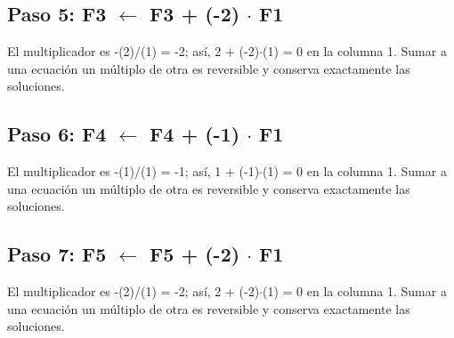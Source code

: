 \documentclass[conference]{IEEEtran}
\begin{document}
\medskip
\subsection*{Paso 5: F3 \(\leftarrow\) F3 + (-2) \(\cdot\) F1}
El multiplicador es -(2)/(1) = -2; así, 2 + (-2)\(\cdot\)(1) = 0 en la columna 1. Sumar a una ecuación un múltiplo de otra es reversible y conserva exactamente las soluciones.


\medskip
\subsection*{Paso 6: F4 \(\leftarrow\) F4 + (-1) \(\cdot\) F1}
El multiplicador es -(1)/(1) = -1; así, 1 + (-1)\(\cdot\)(1) = 0 en la columna 1. Sumar a una ecuación un múltiplo de otra es reversible y conserva exactamente las soluciones.


\medskip
\subsection*{Paso 7: F5 \(\leftarrow\) F5 + (-2) \(\cdot\) F1}
El multiplicador es -(2)/(1) = -2; así, 2 + (-2)\(\cdot\)(1) = 0 en la columna 1. Sumar a una ecuación un múltiplo de otra es reversible y conserva exactamente las soluciones.
\end{document}
